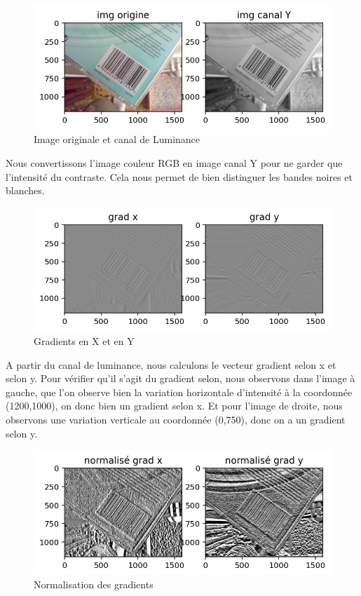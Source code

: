 \documentclass{rapport}
\newcommand{\figsize}{1\textwidth}
\begin{document}
\begin{figure}[H] 
	\centering
	\includegraphics[width=\figsize]{images/Detection/Y.png}
	\caption{Image originale et canal de Luminance}
	\label{Y}
\end{figure}
Nous convertissons l'image couleur RGB en image canal Y pour ne garder que l'intensité du contraste. Cela nous permet de bien distinguer les bandes noires et blanches.
\begin{figure}[H] 
	\centering
	\includegraphics[width=\figsize]{images/Detection/gradients.png}
	\caption{Gradients en X et en Y}
	\label{grad}
\end{figure}
A partir du canal de luminance, nous calculons le vecteur gradient selon x et selon y. Pour vérifier qu'il s'agit du gradient selon, nous observons dans l'image à gauche, que l'on observe bien la variation horizontale d'intensité à la coordonnée (1200,1000), on donc bien un gradient selon x. Et pour l'image de droite, nous observons une variation verticale au coordonnée (0,750), donc on a un gradient selon y.
\begin{figure}[H] 
	\centering
	\includegraphics[width=\figsize]{images/Detection/normalisation.png}
	\caption{Normalisation des gradients}
	\label{norm}
\end{figure}
\end{document}
